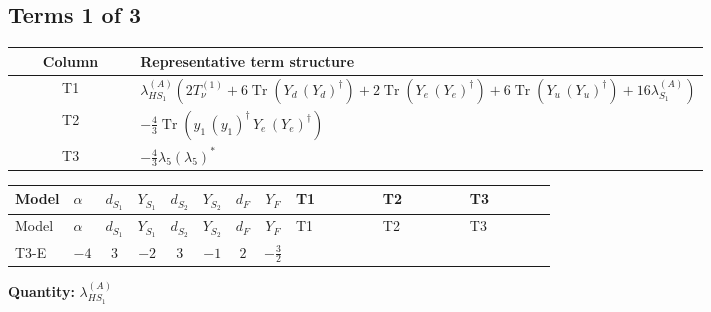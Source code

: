 \documentclass[8pt]{article}
\begin{document}
\begin{landscape}
\subsection*{Terms 1 of 3}
\begin{center}
\begin{tabular}{@{}c >{\raggedright\arraybackslash}p{0.82\linewidth}@{}}
\toprule
Column & Representative term structure \\
\midrule
T1 & \(\displaystyle {\lambda_{HS_1}^{(A)}} (2 T_{\nu}^{(1)}+6 \operatorname{Tr}\!\left({Y_d}\,\left({Y_d}\right)^{\dagger}\right)+2 \operatorname{Tr}\!\left({Y_e}\,\left({Y_e}\right)^{\dagger}\right)+6 \operatorname{Tr}\!\left({Y_u}\,\left({Y_u}\right)^{\dagger}\right)+16 {\lambda_{S_1}^{(A)}})\) \\
\midrule
T2 & \(\displaystyle -\frac{4}{3} \operatorname{Tr}\!\left({y_1}\,\left({y_1}\right)^{\dagger}\,{Y_e}\,\left({Y_e}\right)^{\dagger}\right)\) \\
\midrule
T3 & \(\displaystyle -\frac{4}{3} {\lambda_5} \left({\lambda_5}\right)^{*}\) \\
\midrule
\bottomrule
\end{tabular}
\end{center}
\smallskip
\tiny
\begin{longtable}{@{}llcccccc >{\raggedright\arraybackslash}p{0.21\linewidth} >{\raggedright\arraybackslash}p{0.21\linewidth} >{\raggedright\arraybackslash}p{0.21\linewidth}@{}}
\toprule
Model & $\alpha$ & $d_{S_1}$ & $Y_{S_1}$ & $d_{S_2}$ & $Y_{S_2}$ & $d_F$ & $Y_F$ & T1 & T2 & T3 \\
\midrule
\endfirsthead
\toprule
Model & $\alpha$ & $d_{S_1}$ & $Y_{S_1}$ & $d_{S_2}$ & $Y_{S_2}$ & $d_F$ & $Y_F$ & T1 & T2 & T3 \\
\midrule
\endhead
T3-E & $-4$ & $3$ & $-2$ & $3$ & $-1$ & $2$ & $-\frac{3}{2}$ & \scriptsize\adjustbox{max width=\linewidth}{$\begin{gathered} {\lambda_{HS_1}^{(A)}} (2 T_{\nu}^{(1)}+6 \operatorname{Tr}\!\left({Y_d}\,\left({Y_d}\right)^{\dagger}\right)+2 \operatorname{Tr}\!\left({Y_e}\,\left({Y_e}\right)^{\dagger}\right)+6 \operatorname{Tr}\!\left({Y_u}\,\left({Y_u}\right)^{\dagger}\right)+16 {\lambda_{S_1}^{(A)}})\end{gathered}$} & \scriptsize\adjustbox{max width=\linewidth}{$\begin{gathered} -\frac{4}{3} \operatorname{Tr}\!\left({y_1}\,\left({y_1}\right)^{\dagger}\,{Y_e}\,\left({Y_e}\right)^{\dagger}\right)\end{gathered}$} & \scriptsize\adjustbox{max width=\linewidth}{$\begin{gathered} -\frac{4}{3} {\lambda_5} \left({\lambda_5}\right)^{*}\end{gathered}$} \\
\midrule
\bottomrule
\end{longtable}
\clearpage
\noindent\textbf{Quantity: }$\lambda_{HS_1}^{(A)}$\par\smallskip

\end{landscape}
\end{document}
